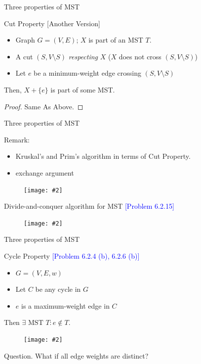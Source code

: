 \documentclass{beamer}
\newcommand{\set}[1]{\{ #1 \}}
\newcommand{\problemno}[1]{\textcolor{blue}{\scriptsize [Problem #1]}}
\newcommand{\fignocaption}[2]
{
  \begin{figure}[htp]
    \centering
      \texttt{[image: \#2]}
  \end{figure}
}
\begin{document}
\begin{frame}{Three properties of MST}
  \begin{block}{Cut Property [Another Version]}
    \begin{itemize}
	  \item Graph $G = (V, E)$; $X$ is part of an MST $T$.
	  \item A cut $(S, V \setminus S)$ \emph{respecting} $X$ ($X$ does not cross
	  $(S, V \setminus S)$)
	  \item Let $e$ be a minimum-weight edge crossing $(S, V \setminus S)$
	\end{itemize}
	Then, $X + \set{e}$ is part of some MST.
  \end{block}

  \begin{proof}
    Same As Above.
  \end{proof}
\end{frame}
\begin{frame}{Three properties of MST}
  \begin{alertblock}{Remark:}
    \begin{itemize}
      \item Kruskal's and Prim's algorithm in terms of Cut
     Property.
     \item exchange argument
    \end{itemize}
  \end{alertblock}

  \fignocaption{width = 0.20\textwidth}{fig/mst-proof.pdf}

  \begin{block}{Divide-and-conquer algorithm for MST \problemno{6.2.15}}
    \fignocaption{width = 0.30\textwidth}
  	  {fig/divide-conqure-mst-counterexample.pdf}
  \end{block}
\end{frame}
\begin{frame}{Three properties of MST}
  \begin{block}{Cycle Property \problemno{6.2.4 (b), 6.2.6 (b)}}
	\begin{itemize}
	  \item $G = (V,E,w)$
	  \item Let $C$ be any cycle in $G$
	  \item $e$ is a maximum-weight edge in $C$
	\end{itemize}
	Then $\exists \textrm{ MST } T: e \notin T$.
  \end{block}

  \fignocaption{width = 0.40\textwidth}{fig/cycle-property.pdf}

  \begin{alertblock}{Question.}
    What if all edge weights are distinct?
  \end{alertblock}
\end{frame}
\end{document}
